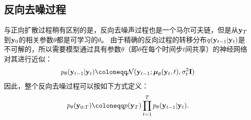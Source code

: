 \subsection{反向去噪过程}
与正向扩散过程稍有区别的是，反向去噪声过程也是一个马尔可夫链，但是从$\mathbf{y}_T$到$\mathbf{y}_0$的相关参数$\theta$都是可学习的$\theta$。
由于精确的反向过程的转移分布$q(\mathbf{y}_{t-1}|\mathbf{y}_t)$是不可解的，所以需要模型通过具有参数$\theta$（即$\theta$在每个时间步$t$间共享）的神经网络对其进行近似：
\begin{equation}
  \label{eq:reverse_step}
  p_\theta(\by_{t-1}|\by_t) \defeq \mathcal{N}(\by_{t-1}; \bmu_\theta(\by_t, t), \sigma_t^2\bI)
\end{equation}
因此，整个反向去噪过程可以按如下方式定义：
\begin{equation}
p_\theta(\by_{0:T}) \defeq p(\by_T)\prod_{t=1}^T p_\theta(\by_{t-1}|\by_t).
\end{equation}
